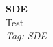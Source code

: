 \documentclass[11pt]{article}
\begin{document}
\begin{center}
  {\LARGE \textbf{SDE}} \\[4pt]
  {\large Test} \\[2pt]
  {\small \textit{Tag: SDE}}
\end{center}

\vspace{1em}
\noindent
\end{document}
